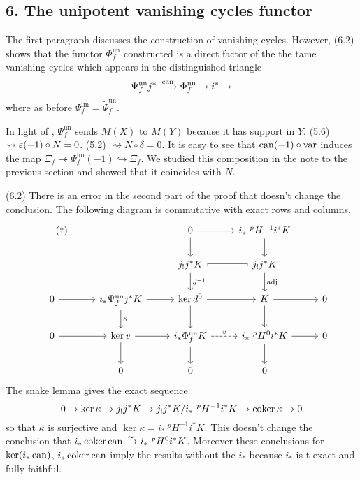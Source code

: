 \documentclass[deligne.tex]{subfiles}
\begin{document}
\subsection*{6. The unipotent vanishing cycles functor}\label{sec:MorelPhi}
\begin{remark}
The first paragraph discusses the construction of vanishing cycles.
However, (6.2) shows that the functor $\Phi_f^{\mathrm{un}}$ constructed
is a direct factor of the the tame vanishing cycles which appears in the
distinguished triangle
\begin{equation*}
	\Psi_f^{\mathrm{un}}j^*\xrightarrow{\mathrm{can}}\Phi^{\mathrm{un}}_f\rightarrow i^*\rightarrow
\end{equation*}
where as before $\Psi_f^{\mathrm{un}}=\tilde\Psi_f^{\mathrm{un}}$.
\end{remark}

In light of \cite[4.1.10.1]{BBD}, $\Psi_f^{\mathrm{un}}$ sends $M(X)$ to
$M(Y)$ because it has support in $Y$.
(5.6) $\rightsquigarrow\varepsilon(-1)\circ N=0$.
(5.2) $\rightsquigarrow N\circ\delta=0$.
It is easy to see that $\operatorname{can}(-1)\circ\operatorname{var}$ induces the map
$\Xi_f\twoheadrightarrow\Psi_f^{\mathrm{un}}(-1)\hookrightarrow\Xi_f$.
We studied this composition in the note to the previous section and showed
that it coincides with $N$.

(6.2) There is an error in the second part of the proof that doesn't change
the conclusion. The following diagram is commutative with exact rows and
columns.
\begin{equation*}\begin{tikzcd}\tag{$\dagger$}\label{morel:6diag}
	&&0\arrow[r]\arrow[d]
	&i_*\ ^pH^{-1}i^*K\arrow[d] \\
	&&j_!j^*K\arrow[r,equals]\arrow[d,"d^{-1}"]
	&j_!j^*K\arrow[d,"\adj"] \\
	0\arrow[r]&i_*\Psi_f^{\mathrm{un}}j^*K\arrow[r]\arrow[d,"\kappa"]
	&\ker d^0\arrow[d]\arrow[r]
	&K\arrow[d]\arrow[r]&0 \\
	0\arrow[r]&\ker v\arrow[r]\arrow[d]
	&i_*\Phi_f^{\mathrm{un}}K\arrow[r,dashed,"v"]\arrow[d]
	&i_*\ ^pH^0i^*K\arrow[r]\arrow[d]&0 \\
	&0&0&0
\end{tikzcd}\end{equation*}
The snake lemma gives the exact sequence
\begin{equation*}
	0\ra\ker\kappa\ra j_!j^*K\ra j_!j^*K/i_*\ ^pH^{-1}i^*K\ra\coker\kappa\ra0
\end{equation*}
so that $\kappa$ is surjective and $\ker\kappa=i_*\ ^pH^{-1}i^*K$.
This doesn't change the conclusion that
$i_*\operatorname{coker}\operatorname{can}\xrightarrow\sim i_*\ ^pH^0i^*K$.
Moreover these conclusions for $\ker(i_*\operatorname{can})$, $i_*\operatorname{coker}\operatorname{can}$ imply the 
results without the $i_*$ because $i_*$ is t-exact and fully faithful.
\end{document}

